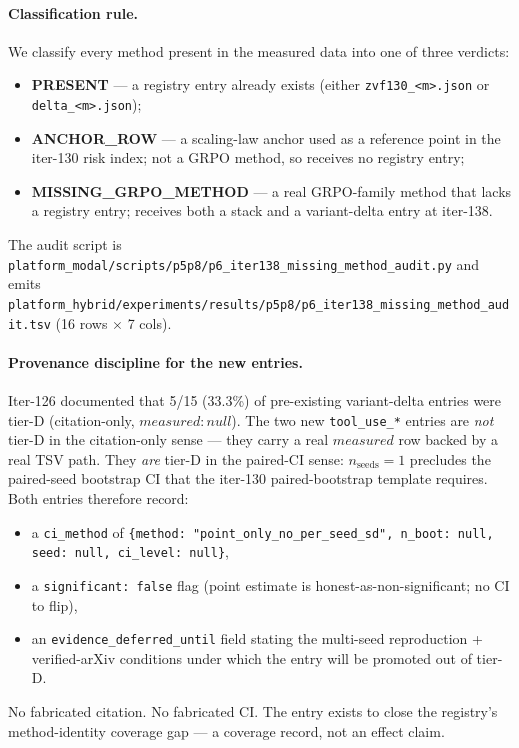 \paragraph{Classification rule.}
We classify every method present in the measured data into one of three
verdicts:
\begin{itemize}
\item \textbf{PRESENT} --- a registry entry already exists (either
  \texttt{zvf130\_<m>.json} or \texttt{delta\_<m>.json});
\item \textbf{ANCHOR\_ROW} --- a scaling-law anchor used as a
  reference point in the iter-130 risk index; not a GRPO method, so
  receives no registry entry;
\item \textbf{MISSING\_GRPO\_METHOD} --- a real GRPO-family method
  that lacks a registry entry; receives both a stack and a
  variant-delta entry at iter-138.
\end{itemize}
The audit script is
\texttt{platform_modal/scripts/p5p8/p6\_iter138\_missing\_method\_audit.py} and
emits \texttt{platform_hybrid/experiments/results/p5p8/p6\_iter138\_missing\_method\_audit.tsv}
(16 rows $\times$ 7 cols).

\paragraph{Provenance discipline for the new entries.}
Iter-126 documented that 5/15 (33.3\%) of pre-existing variant-delta
entries were tier-D (citation-only, $\mathit{measured}: \mathit{null}$).
The two new \texttt{tool\_use\_*} entries are \emph{not} tier-D in the
citation-only sense --- they carry a real $\mathit{measured}$ row
backed by a real TSV path. They \emph{are} tier-D in the paired-CI
sense: $n_{\text{seeds}}=1$ precludes the paired-seed bootstrap CI
that the iter-130 paired-bootstrap template requires. Both entries
therefore record:
\begin{itemize}
\item a \texttt{ci\_method} of
  \texttt{\{method: "point\_only\_no\_per\_seed\_sd", n\_boot: null,
  seed: null, ci\_level: null\}},
\item a \texttt{significant: false} flag (point estimate is
  honest-as-non-significant; no CI to flip),
\item an \texttt{evidence\_deferred\_until} field stating the
  multi-seed reproduction + verified-arXiv conditions under which
  the entry will be promoted out of tier-D.
\end{itemize}
No fabricated citation. No fabricated CI. The entry exists to close
the registry's method-identity coverage gap --- a coverage record,
not an effect claim.

